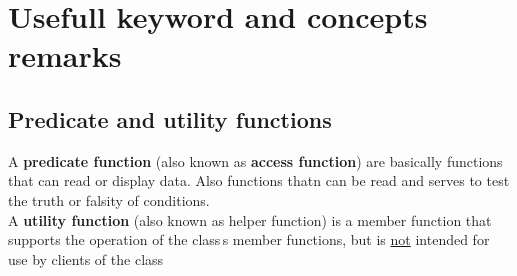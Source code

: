 \section{Usefull keyword and concepts remarks}
\label{sec:Useufull-keyword-remarks}
\subsection{Predicate and utility functions}
\label{subsec:Keyword auto}
A \textbf{predicate function} (also known as \textbf{access function}) are basically functions that can read or display data. Also functions thatn can be read and serves to test the truth or falsity of conditions.\\

\noindent A \textbf{utility function} (also known as helper function) is a  member function that supports the operation of the class\textquotesingle{}\,s  member functions, but is \underline{not} intended for use by clients of the class


